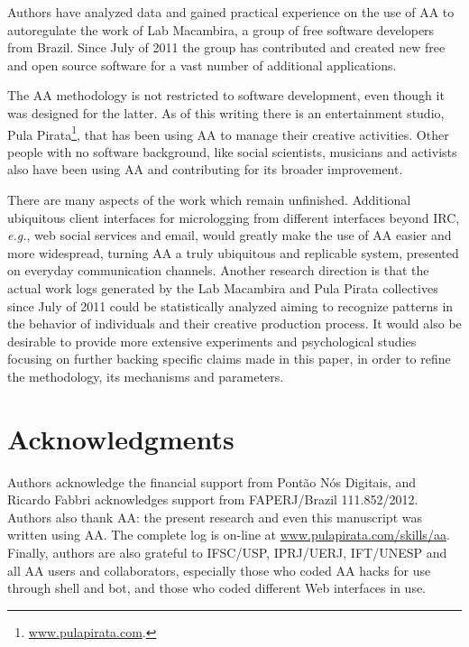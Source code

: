 \documentclass{article}
\newcommand{\eg}{{\it e.g.}}
\newcommand{\indraftnote}[1]{}
\newcommand{\todo}[1]{\indraftnote{todo: #1}}
\begin{document}
Authors have analyzed data and gained practical experience on
the use of AA to autoregulate the work of Lab Macambira, a group of free
software developers from Brazil. Since July of 2011 the group has contributed
and created new free and open source software for a vast number of additional applications.

The AA methodology is not restricted to software development, even though it was
designed for the latter. As of this writing there is an entertainment studio,
Pula Pirata\footnote{ \url{www.pulapirata.com}.}, that has been using AA to
manage their creative activities.  Other people with no software background,
like social scientists, musicians and activists also have been using AA and
contributing for its broader improvement.

There are many aspects of the work which remain unfinished. Additional
ubiquitous client interfaces for micrologging from different interfaces beyond
IRC, \eg, web social services and email, would greatly make the use of AA easier
and more widespread, turning AA a truly ubiquitous and replicable system,
presented on everyday communication channels. Another research direction is that
the actual work logs generated by the Lab Macambira and Pula Pirata collectives
since July of 2011 could be statistically analyzed aiming to recognize
patterns in the behavior of individuals and their creative production process.
It would also be desirable to provide more extensive experiments and
psychological studies focusing on further backing specific claims made in this
paper, in order to refine the methodology, its mechanisms and parameters.


\section*{Acknowledgments}
Authors acknowledge the financial support from Pont\~{a}o N\'{o}s Digitais, and
Ricardo Fabbri acknowledges support from FAPERJ/Brazil 111.852/2012.
Authors also thank AA: the present research and even this
manuscript was written using AA. The complete log is on-line at
\url{www.pulapirata.com/skills/aa}. Finally, authors are also grateful to IFSC/USP, IPRJ/UERJ, IFT/UNESP and all AA users and collaborators, especially those who coded AA hacks for use through shell and bot, and those who coded different Web interfaces in use.


\nocite{last2003}
\nocite{german2003}
\nocite{carmel1999}
\nocite{carmel2001}
\nocite{komi2005}
\nocite{battin2001}

%
%


\end{document}
